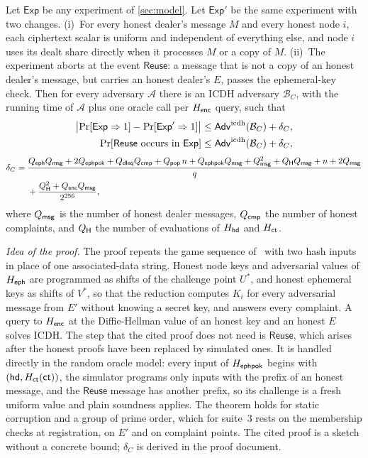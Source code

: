 \begin{theorem}\label{thm:enc}
Let $\mathsf{Exp}$ be any experiment of \cref{sec:model}. Let $\mathsf{Exp}'$ be the same experiment with two changes. \textup{(i)}~For every honest dealer's message $M$ and every honest node $i$, each ciphertext scalar is uniform and independent of everything else, and node $i$ uses its dealt share directly when it processes $M$ or a copy of $M$. \textup{(ii)}~The experiment aborts at the event $\mathsf{Reuse}$: a message that is not a copy of an honest dealer's message, but carries an honest dealer's $E$, passes the ephemeral-key check. Then for every adversary $\mathcal{A}$ there is an ICDH adversary $\mathcal{B}_C$, with the running time of $\mathcal{A}$ plus one oracle call per $H_{\mathsf{enc}}$ query, such that
\begin{align*}
  \bigl|\Pr[\mathsf{Exp} \Rightarrow 1] - \Pr[\mathsf{Exp}' \Rightarrow 1]\bigr| &\le \mathsf{Adv}^{\mathrm{icdh}}(\mathcal{B}_C) + \delta_C , \\
  \Pr[\mathsf{Reuse} \text{ occurs in } \mathsf{Exp}] &\le \mathsf{Adv}^{\mathrm{icdh}}(\mathcal{B}_C) + \delta_C ,
\end{align*}
\begin{align*}
  \delta_C ={}& \frac{Q_{\mathsf{eph}}Q_{\mathsf{msg}} + 2Q_{\mathsf{ephpok}} + Q_{\mathsf{dleq}}Q_{\mathsf{cmp}} + Q_{\mathsf{pop}}\,n + Q_{\mathsf{ephpok}}Q_{\mathsf{msg}} + Q_{\mathsf{msg}}^2 + Q_{\mathsf{H}}Q_{\mathsf{msg}} + n + 2Q_{\mathsf{msg}}}{q} \\
  &+ \frac{Q_{\mathsf{H}}^2 + Q_{\mathsf{enc}}Q_{\mathsf{msg}}}{2^{256}} ,
\end{align*}
where $Q_{\mathsf{msg}}$ is the number of honest dealer messages, $Q_{\mathsf{cmp}}$ the number of honest complaints, and $Q_{\mathsf{H}}$ the number of evaluations of $H_{\mathsf{hd}}$ and $H_{\mathsf{ct}}$.
\end{theorem}

\emph{Idea of the proof.} The proof repeats the game sequence of~\cite[Theorem~2]{GS22} with two hash inputs in place of one associated-data string. Honest node keys and adversarial values of $H_{\mathsf{eph}}$ are programmed as shifts of the challenge point $U^*$, and honest ephemeral keys as shifts of $V^*$, so that the reduction computes $K_i$ for every adversarial message from $E'$ without knowing a secret key, and answers every complaint. A query to $H_{\mathsf{enc}}$ at the Diffie-Hellman value of an honest key and an honest $E$ solves ICDH. The step that the cited proof does not need is $\mathsf{Reuse}$, which arises after the honest proofs have been replaced by simulated ones. It is handled directly in the random oracle model: every input of $H_{\mathsf{ephpok}}$ begins with $(\mathsf{hd}, H_{\mathsf{ct}}(\mathsf{ct}))$, the simulator programs only inputs with the prefix of an honest message, and the $\mathsf{Reuse}$ message has another prefix, so its challenge is a fresh uniform value and plain soundness applies. The theorem holds for static corruption and a group of prime order, which for suite~3 rests on the membership checks at registration, on $E'$ and on complaint points. The cited proof is a sketch without a concrete bound; $\delta_C$ is derived in the proof document.

